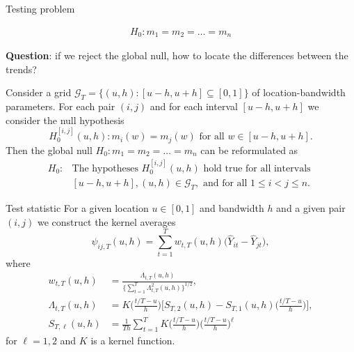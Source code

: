 \documentclass[10pt, handout]{beamer}
\begin{document}
\begin{frame}{Testing problem}

\begin{align*}
H_0: m_1 = m_2 = \ldots = m_n
\end{align*}\pause

\vspace{-4mm}
\textbf{Question}: if we reject the global null, how to locate the differences between the trends? \pause

Consider a grid $\mathcal{G}_T = \{(u, h): [u-h, u+h] \subseteq [0, 1]\}$ of location-bandwidth parameters. \pause For each pair $(i, j)$ and for each interval $[u-h, u+h]$ we consider the null hypothesis 
\[ H_0^{[i,j]}(u,h): m_i(w) = m_j(w) \text{ for all } w \in [u-h,u+h]. \]\pause
Then the global null $H_0: m_1 = m_2 = \ldots = m_n$ can be reformulated as
\begin{align*}
H_0:  &\text{The hypotheses } H_0^{[i,j]}(u,h) \text{ hold true for all intervals } \\ &[u- h , u+h], (u, h) \in \mathcal{G}_T, \text{ and for all } 1 \le i < j \le n. 
\end{align*} 
\end{frame}


\begin{frame}{Test statistic}
For a given location $u \in [0,1]$ and bandwidth $h$ and a given pair $(i, j)$ we construct the kernel averages
\begin{equation*}
\widehat{\psi}_{ij, T}(u,h) = \sum\limits_{t=1}^T w_{t,T}(u,h) \big(\widehat{Y}_{it} - \widehat{Y}_{jt}), 
\end{equation*}\pause
\vspace{-3mm}
where 
\begin{align*}
w_{t,T}(u,h) &= \frac{\Lambda_{t,T}(u,h)}{ \{\sum\nolimits_{t=1}^T \Lambda_{t,T}^2(u,h)\}^{1/2} } ,\\
\Lambda_{t,T}(u,h) &= K\Big(\frac{t/T-u}{h}\Big) \Big[ S_{T,2}(u,h)  - S_{T,1}(u,h)\Big(\frac{t/T-u}{h}\Big) \Big], \\
S_{T,\ell}(u,h) &= \frac{1}{Th} \sum\nolimits_{t=1}^T K\Big(\frac{t/T-u}{h}\Big) \Big(\frac{t/T-u}{h}\Big)^\ell
\end{align*}
for $\ell = 1,2$ and $K$ is a kernel function.
\end{frame}
\end{document}
